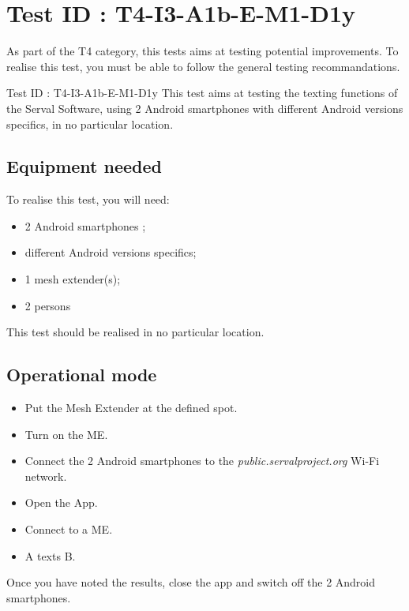 \documentclass[oneside]{book}
\begin{document}
\section{Test ID : T4-I3-A1b-E-M1-D1y}
\begin{itshape}
As part of the T4 category, this tests aims at testing potential improvements.
To realise this test, you must be able to follow the general testing recommandations. 
\end{itshape}
\newline
Test ID : T4-I3-A1b-E-M1-D1y
 This test aims at testing the texting functions of the Serval Software, using 2 Android smartphones with different Android versions specifics, in no particular location.
\subsection{Equipment needed} To realise this test, you will need:
\begin{itemize}
\item 2 Android smartphones ;
\item different Android versions specifics;
\item 1 mesh extender(s);
\item 2 persons
\end{itemize}
This test should be realised in no particular location.
\subsection{Operational mode} \begin{itemize}
\item Put the Mesh Extender at the defined spot.
\item Turn on the ME.
\item Connect the 2 Android smartphones to the \emph{public.servalproject.org} Wi-Fi network.
\item Open the App.
\item Connect to a ME.
\item A texts B.
\end{itemize}
Once you have noted the results, close the app and switch off the 2 Android smartphones.
\end{document}
